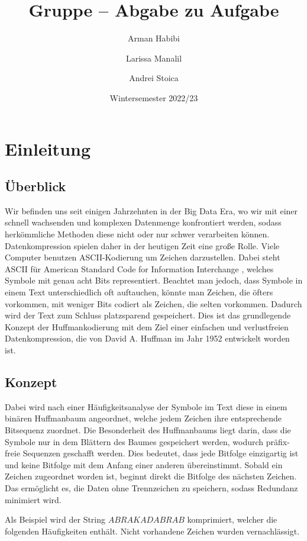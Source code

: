 \documentclass[course=erap]{aspdoc}
\author{Arman Habibi \and Larissa Manalil \and Andrei Stoica}
\date{Wintersemester 2022/23} %
\title{Gruppe \theGroup{} -- Abgabe zu Aufgabe \theNumber}
\begin{document}
\maketitle

\section{Einleitung}
\subsection{Überblick}

Wir befinden uns seit einigen Jahrzehnten in der Big Data Era, wo wir mit einer schnell wachsenden und komplexen Datenmenge konfrontiert werden, sodass herkömmliche Methoden diese nicht oder nur schwer verarbeiten können. Datenkompression spielen daher in der heutigen Zeit eine große Rolle. Viele Computer benutzen ASCII-Kodierung%
 um Zeichen darzustellen. Dabei steht ASCII für American Standard Code for Information Interchange \cite{Ascii}, welches Symbole mit genau acht Bits representiert. Beachtet man jedoch, dass Symbole in einem Text unterschiedlich oft auftauchen, könnte man Zeichen, die öfters vorkommen, mit weniger Bits codiert als Zeichen, die selten vorkommen. Dadurch wird der Text zum Schluss platzsparend gespeichert.
Dies ist das grundlegende Konzept der Huffmankodierung mit dem Ziel einer einfachen und verlustfreien Datenkompression, die von David A. Huffman im Jahr 1952 entwickelt worden ist.
\subsection{Konzept}
Dabei wird nach einer Häufigkeitsanalyse der Symbole im Text diese in einem binären Huffmanbaum angeordnet, welche jedem Zeichen ihre entsprechende Bitsequenz zuordnet. Die Besonderheit des Huffmanbaums liegt darin, dass die Symbole nur in dem Blättern des Baumes gespeichert werden, wodurch präfix-freie Sequenzen geschafft werden.
Dies bedeutet, dass jede Bitfolge einzigartig ist und keine Bitfolge mit dem Anfang einer anderen übereinstimmt. Sobald ein Zeichen zugeordnet worden ist, beginnt direkt die Bitfolge des nächsten Zeichen. Das ermöglicht es, die Daten ohne Trennzeichen zu speichern, sodass Redundanz minimiert wird.

Als Beispiel wird der String $ABRAKADABRAB$ komprimiert, welcher die folgenden Häufigkeiten enthält. Nicht vorhandene Zeichen wurden vernachlässigt.
\end{document}
